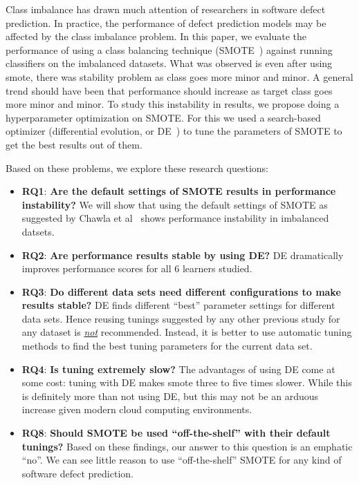 \documentclass[conference]{IEEEtran}
\newcommand{\bi}{\begin{itemize}[leftmargin=0.4cm]}
\newcommand{\ei}{\end{itemize}}
\begin{document}
Class imbalance has drawn much attention of researchers in software defect prediction. In practice, the performance of defect prediction models may be affected by the class imbalance problem. In this paper, we evaluate the performance of using a class balancing technique (SMOTE~\cite{chawla2002smote}) against running classifiers on the imbalanced datasets. What was observed is even after using smote, there was stability problem as class goes more minor and minor. A general trend should have been that performance should increase as target class goes more minor and minor. To study this instability in results, we propose doing a hyperparameter optimization on SMOTE. For this we used a search-based optimizer (differential evolution, or DE~\cite{storn1997differential}) to tune the parameters of SMOTE to get the best results out of them.

Based on these problems, we explore these research questions:  
   
\bi

\item \textbf{RQ1}: \textbf{Are the default settings of SMOTE results in performance instability?} We will show that using the default settings of SMOTE as suggested by Chawla et al~\cite{chawla2002smote} shows performance instability in imbalanced datsets.
    \item \textbf{RQ2}: \textbf{Are performance results stable by using DE?} DE dramatically improves performance scores for all 6 learners studied.
    \item \textbf{RQ3}: \textbf{Do different data sets
      need different configurations to make results stable?} DE finds different ``best'' parameter settings for different data sets. Hence reusing tunings  suggested  by  any other  previous study  for any dataset is \underline{{\em not}} recommended. Instead,  it is better to
      use  automatic  tuning  methods  to find the best tuning parameters for the current data set.
    \item \textbf{RQ4}: \textbf{Is tuning extremely slow?}
      The advantages of  using DE come at some cost:
      tuning with DE makes smote three to five times slower.
      While this is definitely more than not using DE, but this may not be an arduous increase
      given modern cloud computing environments. 
    \item \textbf{RQ8}: \textbf{Should SMOTE be used ``off-the-shelf'' with their default tunings?}
      Based on these findings, our answer to this question is an emphatic ``no''. We can see little reason to use ``off-the-shelf'' SMOTE for any kind of software defect prediction.
\ei
\end{document}
